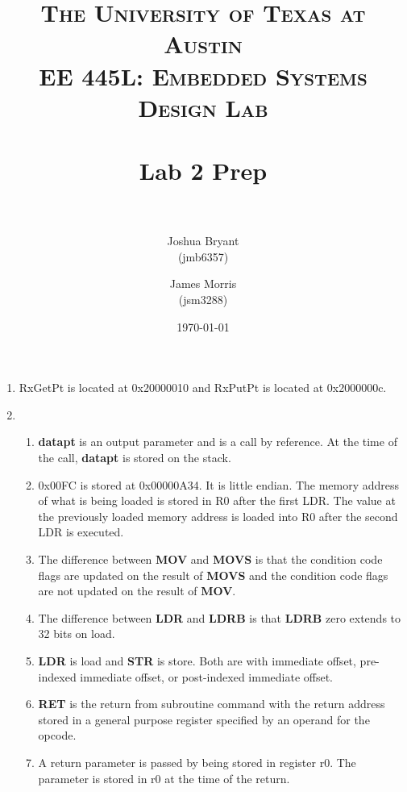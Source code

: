 \documentclass[paper=a4, fontsize=11pt]{scrartcl} %
\title{	
\normalfont \normalsize 
\textsc{The University of Texas at Austin\\ EE 445L: Embedded Systems Design Lab} \\ [25pt] %
\horrule{0.5pt} \\[0.1cm] %
\Large Lab 2 Prep \\ %
\horrule{2pt} \\[0.2cm] %
}
\author{Joshua Bryant\\
		(jmb6357)
		\and
		James Morris\\
		(jsm3288)}
\date{\normalsize\today} %
\numberwithin{equation}{section} %
\numberwithin{figure}{section} %
\numberwithin{table}{section} %
\begin{document}
\maketitle %


\begin{enumerate}
\item %
	RxGetPt is located at 0x20000010 and RxPutPt is located at 0x2000000c.

\item %
	\begin{enumerate}
		\item %
			\textbf{datapt} is an output parameter and is a call by reference. At the time of the call, \textbf{datapt} is stored on the stack.
			
		\item %
			0x00FC is stored at 0x00000A34. It is little endian. The memory address of what is being loaded is stored in R0 after the first LDR. The value at the previously loaded memory address is loaded into R0 after the second LDR is executed.
			
		\item %
			The difference between \textbf{MOV} and \textbf{MOVS} is that the condition code flags are updated on the result of \textbf{MOVS} and the condition code flags are not updated on the result of \textbf{MOV}.
			
		\item %
			The difference between \textbf{LDR} and \textbf{LDRB} is that \textbf{LDRB} zero extends to 32 bits on load.
			
		\item %
			\textbf{LDR} is load and \textbf{STR} is store. Both are with immediate offset, pre-indexed immediate offset, or post-indexed immediate offset.
			
		\item %
			\textbf{RET} is the return from subroutine command with the return address stored in a general purpose register specified by an operand for the opcode.
			
		\item %
			A return parameter is passed by being stored in register r0. The parameter is stored in r0 at the time of the return.
	\end{enumerate}


\end{enumerate}
\end{document}
